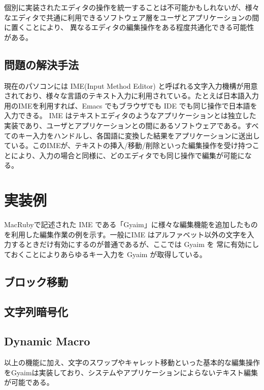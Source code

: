 \documentclass[twoside]{wiss}
\begin{document}
個別に実装されたエディタの操作を統一することは不可能かもしれないが、様々なエディタで共通に利用できるソフトウェア層をユーザとアプリケーションの間に置くことにより、 異なるエディタの編集操作をある程度共通化できる可能性がある。

\subsection{問題の解決手法}

現在のパソコンには IME(Input Method Editor) と呼ばれる文字入力機構が用意されており、様々な言語のテキスト入力に利用されている。たとえば日本語入力用のIMEを利用すれば、Emacs でもブラウザでも IDE でも同じ操作で日本語を入力できる。
IME はテキストエディタのようなアプリケーションとは独立した実装であり、ユーザとアプリケーションとの間にあるソフトウェアである。すべてのキー入力をハンドルし、各国語に変換した結果をアプリケーションに送出している。このIMEが、テキストの挿入/移動/削除といった編集操作を受け持つことにより、入力の場合と同様に、どのエディタでも同じ操作で編集が可能になる。

\section{実装例}

MacRubyで記述された IME である「Gyaim」に様々な編集機能を追加したものを利用した編集作業の例を示す。一般にIME はアルファベット以外の文字を入力するときだけ有効にするのが普通であるが、ここでは Gyaim を 常に有効にしておくことによりあらゆるキー入力を Gyaim が取得している。

\subsection{ブロック移動}

\subsection{文字列暗号化}
\subsection{Dynamic Macro}

以上の機能に加え、文字のスワップやキャレット移動といった基本的な編集操作をGyaimは実装しており、システムやアプリケーションによらないテキスト編集が可能である。
\end{document}
